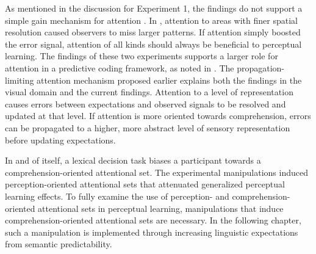 As mentioned in the discussion for Experiment 1, the findings do not support a simple gain mechanism for attention \citep[contra][]{Clark2013}.  
In \citet{Yeshurun1998}, attention to areas with finer spatial resolution caused observers to miss larger patterns.  
If attention simply boosted the error signal, attention of all kinds should always be beneficial to perceptual learning.
The findings of these two experiments supports a larger role for attention in a predictive coding framework, as noted in \citet{Block2013}.
The propagation-limiting attention mechanism proposed earlier explains both the findings in the visual domain and the current findings.
Attention to a level of representation causes errors between expectations and observed signals to be resolved and updated at that level.
If attention is more oriented towards comprehension, errors can be propagated to a higher, more abstract level of sensory representation before updating expectations.

In and of itself, a lexical decision task biases a participant towards a comprehension-oriented attentional set.
The experimental manipulations induced perception-oriented attentional sets that attenuated generalized perceptual learning effects.
To fully examine the use of perception- and comprehension-oriented attentional sets in perceptual learning, manipulations that induce comprehension-oriented attentional sets are necessary.
In the following chapter, such a manipulation is implemented through increasing linguistic expectations from semantic predictability.




